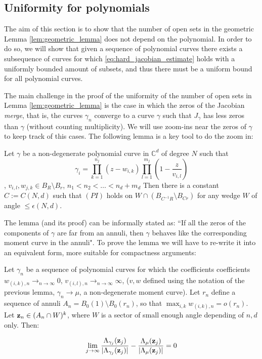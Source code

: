 
	\subsection{Uniformity for polynomials} %
	\label{sub:uniformity_for_polynomials}

	The aim of this section is to show that the number of open sets in the geometric Lemma \ref{lem:geometric_lemma} does not depend on the polynomial. In order to do so, we will show that given a sequence of polynomial curves there exists a subsequence of curves for which \eqref{eq:hard_jacobian_estimate} holds with a uniformly bounded amount of subsets, and thus there must be a uniform bound for all polynomial curves.

	The main challenge in the proof of the uniformity of the number of open sets in Lemma \ref{lem:geometric_lemma} is the case in which the zeros of the Jacobian \textit{merge}, that is, the curves $\gamma_n$ converge to a curve $\gamma$ such that $J_\gamma$ has less zeros than $\gamma$ (without counting multiplicity). We will use zoom-ins near the zeros of $\gamma$ to keep track of this cases. The following lemma is a key tool to do the zoom in:

	\begin{lemma}\label{lem:annuli_continuity}
		Let $\gamma$ be a non-degenerate polynomial curve in $\mathbb C^d$ of degree $N$ such that $$\gamma_i = \prod_{k=1}^{n_j} (z - w_{i,k}) \prod_{l=1}^{m_j} \left(1 - \frac{z}{v_{i,l}}\right)$$, $v_{i,l}, w_{j,k} \in B_{R }\setminus B_{r}$, $n_1<n_2< \dots < n_d + m_d$ Then there is a constant $C := C(N, d)$ such that $(PI)$ holds on $W \cap (B_{C^{-1}R }\setminus B_{C r})$ for any wedge $W$ of angle $\le \epsilon(N,d)$.
	\end{lemma}

	The lemma (and its proof) can be informally stated as: ``If all the zeros of the components of $\gamma$ are far from an annuli, then $\gamma$ behaves like the corresponding moment curve in the annuli". To prove the lemma we will have to re-write it into an equivalent form, more suitable for compactness arguments:

	\begin{lemma} \label{lem:annuli_convergence}
		Let $\gamma_n$ be a sequence of polynomial curves for which the coefficients coefficients $w_{(i,k),n} \to_{n\to \infty} 0$, $v_{(i,l),n} \to_{n\to \infty} \infty$,  ($v,w$ defined using the notation of the previous lemma, $\gamma_n \to \mu$, a non-degenerate moment curve). Let $r_n$ define a sequence of annuli $A_n = B_0(1)\setminus B_0(r_n)$, so that $\max_{i,k} w_{(i,k),n} = o(r_n)$. Let ${\bf z}_n \in (A_n \cap W)^k$, where $W$ is a sector of small enough angle depending of $n,d$ only. Then:

		\begin{equation}
			\lim_{j\to \infty} \frac{\Lambda_{\gamma_j}({\bf z}_j)}
			{|\Lambda_{\gamma_j}({\bf z}_j)|}-\frac{\Lambda_{\mu}({\bf z}_j)}
			{|\Lambda_{\mu}({\bf z}_j)|} = 0
		\end{equation}
	\end{lemma}

